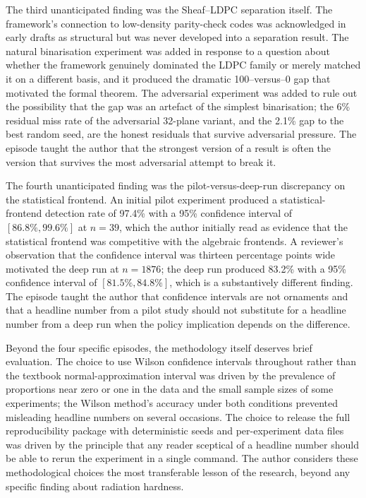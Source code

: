 \documentclass[12pt,a4paper]{article}
\theoremstyle{plain}
\theoremstyle{definition}
\begin{document}
The third unanticipated finding was the Sheaf--LDPC separation itself. The framework's connection to low-density parity-check codes was acknowledged in early drafts as structural but was never developed into a separation result. The natural binarisation experiment was added in response to a question about whether the framework genuinely dominated the LDPC family or merely matched it on a different basis, and it produced the dramatic 100--versus--0 gap that motivated the formal theorem. The adversarial experiment was added to rule out the possibility that the gap was an artefact of the simplest binarisation; the 6\% residual miss rate of the adversarial 32-plane variant, and the 2.1\% gap to the best random seed, are the honest residuals that survive adversarial pressure. The episode taught the author that the strongest version of a result is often the version that survives the most adversarial attempt to break it.

The fourth unanticipated finding was the pilot-versus-deep-run discrepancy on the statistical frontend. An initial pilot experiment produced a statistical-frontend detection rate of 97.4\% with a 95\% confidence interval of $[86.8\%, 99.6\%]$ at $n = 39$, which the author initially read as evidence that the statistical frontend was competitive with the algebraic frontends. A reviewer's observation that the confidence interval was thirteen percentage points wide motivated the deep run at $n = 1876$; the deep run produced 83.2\% with a 95\% confidence interval of $[81.5\%, 84.8\%]$, which is a substantively different finding. The episode taught the author that confidence intervals are not ornaments and that a headline number from a pilot study should not substitute for a headline number from a deep run when the policy implication depends on the difference.

Beyond the four specific episodes, the methodology itself deserves brief evaluation. The choice to use Wilson confidence intervals throughout rather than the textbook normal-approximation interval was driven by the prevalence of proportions near zero or one in the data and the small sample sizes of some experiments; the Wilson method's accuracy under both conditions prevented misleading headline numbers on several occasions. The choice to release the full reproducibility package with deterministic seeds and per-experiment data files was driven by the principle that any reader sceptical of a headline number should be able to rerun the experiment in a single command. The author considers these methodological choices the most transferable lesson of the research, beyond any specific finding about radiation hardness.
\end{document}
